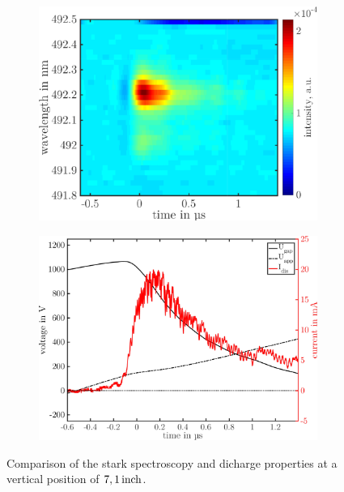 \documentclass[a4paper,10pt,twoside]{article}
\begin{document}
				\begin{figure}
					\centering
					\begin{subfigure}[t]{0.5\textwidth}
						\includegraphics[width=\textwidth]{figures/stark/stark_71in.pdf}
					\end{subfigure}
					\begin{subfigure}[b]{0.5\textwidth}
						\includegraphics[width=\textwidth]{figures/stark/currentdis71.pdf}
					\end{subfigure}
					\caption{Comparison of the stark spectroscopy and dicharge properties at a vertical position of $\unit[7,1]{inch}$. }
					\label{img:stark71comparison}
				\end{figure}
\end{document}
